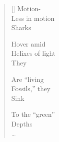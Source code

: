 \label{ch:sharks}
\settowidth{\versewidth}{\hspace*{3\vgap} \ldots}
\begin{verse}[\versewidth]
\hspace*{1\vgap} Motion-\\
Less in motion\\
\hspace*{3\vgap} Sharks

\hspace*{1\vgap} Hover amid\\
Helixes of light\\
\hspace*{3\vgap} They

\hspace*{1\vgap} Are ``living\\
Fossils,'' they\\
\hspace*{3\vgap} Sink

\hspace*{1\vgap} To the ``green''\\
Depths\\
\hspace*{3\vgap} \ldots
\end{verse}
